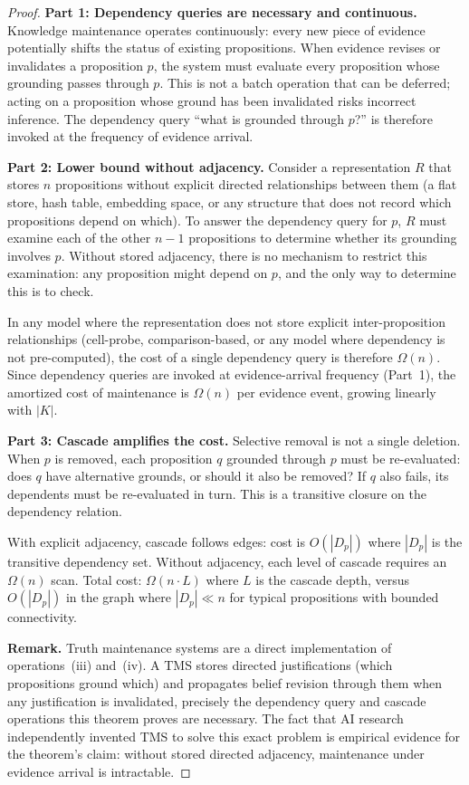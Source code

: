 \documentclass[11pt]{article}
\theoremstyle{definition}
\begin{document}
\begin{proof}
\textbf{Part 1: Dependency queries are necessary and continuous.}
Knowledge maintenance operates continuously: every new piece of evidence
potentially shifts the status of existing propositions. When evidence
revises or invalidates a proposition $p$, the system must evaluate every
proposition whose grounding passes through $p$. This is not a batch
operation that can be deferred; acting on a proposition whose ground
has been invalidated risks incorrect inference. The dependency query
``what is grounded through $p$?'' is therefore invoked at the frequency
of evidence arrival.

\textbf{Part 2: Lower bound without adjacency.}
Consider a representation $R$ that stores $n$ propositions without
explicit directed relationships between them (a flat store, hash table,
embedding space, or any structure that does not record which propositions
depend on which). To answer the dependency query for $p$, $R$ must
examine each of the other $n - 1$ propositions to determine whether its
grounding involves $p$. Without stored adjacency, there is no mechanism
to restrict this examination: any proposition might depend on $p$, and
the only way to determine this is to check.

In any model where the representation does not store explicit
inter-proposition relationships (cell-probe, comparison-based, or any
model where dependency is not pre-computed), the cost of a single
dependency query is therefore $\Omega(n)$. Since dependency queries are
invoked at evidence-arrival frequency (Part~1), the amortized cost of
maintenance is $\Omega(n)$ per evidence event, growing linearly with
$|K|$.

\textbf{Part 3: Cascade amplifies the cost.}
Selective removal is not a single deletion. When $p$ is removed, each
proposition $q$ grounded through $p$ must be re-evaluated: does $q$ have
alternative grounds, or should it also be removed? If $q$ also fails,
its dependents must be re-evaluated in turn. This is a transitive
closure on the dependency relation.

With explicit adjacency, cascade follows edges: cost is $O(|D_p|)$ where
$|D_p|$ is the transitive dependency set. Without adjacency, each level
of cascade requires an $\Omega(n)$ scan. Total cost: $\Omega(n \cdot L)$
where $L$ is the cascade depth, versus $O(|D_p|)$ in the graph where
$|D_p| \ll n$ for typical propositions with bounded connectivity.

\textbf{Remark.} Truth maintenance systems \cite{Doyle1979,DeKleer1986}
are a direct implementation of operations~(iii) and~(iv). A TMS stores
directed justifications (which propositions ground which) and propagates
belief revision through them when any justification is invalidated,
precisely the dependency query and cascade operations this theorem
proves are necessary. The fact that AI research independently invented
TMS to solve this exact problem is empirical evidence for the theorem's
claim: without stored directed adjacency, maintenance under evidence
arrival is intractable.


\end{proof}
\end{document}
